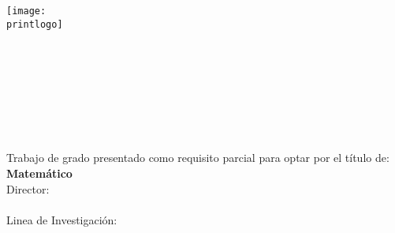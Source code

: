 \begin{center}
    \texttt{[image: \\printlogo]}\\%
	\vspace{1.5cm} %
	\textbf{\Huge{\printtitle}} \\ 
    \vspace{5cm}  %
 	\textbf{\LARGE{\printauthor}} \\
    \vspace{5cm}%
 	\printuniversity \\
 	\printfaculty \\
 	\printplace \\
 	\printyear
    \thispagestyle{empty}
\end{center}
\newpage
\begin{center}
	\textbf{\Huge{\printtitle}} \\ 
	\vspace{3.5cm} 
	\textbf{\LARGE{\printauthor}} \\
	\vspace{2cm}
	Trabajo de grado presentado como requisito parcial para optar por el título de: \\
	\textbf{Matemático}\\
	\vspace{2cm}
	Director:\\
	\printdirector\\
	\vspace{2cm}
	Linea de Investigación:\\
	\printline\\
	\vspace{2cm}
	\printuniversity \\
	\printfaculty \\
	\printplace \\
	\printyear
	\thispagestyle{empty}
	\newpage
\end{center}
